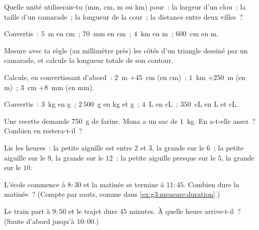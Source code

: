 \begin{exercise}[$\star$]\label{exo:g3:measure:1}
Quelle unité utiliserais-tu (mm, cm, m ou km) pour~: la largeur
d'un clou~; la taille d'un camarade~; la longueur de la cour~; la
distance entre deux villes~?
\end{exercise}

\begin{exercise}[$\star$]\label{exo:g3:measure:2}
Convertis~: $5$~m en cm~; \quad $70$~mm en cm~; \quad $4$~km en m~;
\quad $600$~cm en m.
\end{exercise}

\begin{exercise}[$\star$]\label{exo:g3:measure:3}
Mesure avec ta règle (au millimètre près) les côtés d'un
triangle dessiné par un camarade, et calcule la longueur totale de
son contour.
\end{exercise}

\begin{exercise}[$\star$]\label{exo:g3:measure:4}
Calcule, en convertissant d'abord~: $2$~m $+ 45$~cm (en cm)~; \quad
$1$~km $+ 250$~m (en m)~; \quad $3$~cm $+ 8$~mm (en mm).
\end{exercise}

\begin{exercise}[$\star$]\label{exo:g3:measure:5}
Convertis~: $3$~kg en g~; \quad $2\,500$~g en kg et g~; \quad
$4$~L en cL~; \quad $350$~cL en L et cL.
\end{exercise}

\begin{exercise}[$\star$]\label{exo:g3:measure:6}
Une recette demande $750$~g de farine. Mona a un sac de $1$~kg. En
a-t-elle assez~? Combien en restera-t-il~?
\end{exercise}

\begin{exercise}[$\star$]\label{exo:g3:measure:7}
Lis les heures~: la petite aiguille est entre $2$ et $3$, la grande
sur le $6$~; la petite aiguille sur le $9$, la grande sur le $12$~;
la petite aiguille presque sur le $5$, la grande sur le $10$.
\end{exercise}

\begin{exercise}[$\star$]\label{exo:g3:measure:8}
L'école commence à $8{:}30$ et la matinée se termine à
$11{:}45$. Combien dure la matinée~? (Compte par sauts, comme dans
\cref{ex:g3:measure:duration}.)
\end{exercise}

\begin{exercise}[$\star$]\label{exo:g3:measure:9}
Le train part à $9{:}50$ et le trajet dure $45$ minutes. À
quelle heure arrive-t-il~? (Saute d'abord jusqu'à $10{:}00$.)
\end{exercise}

